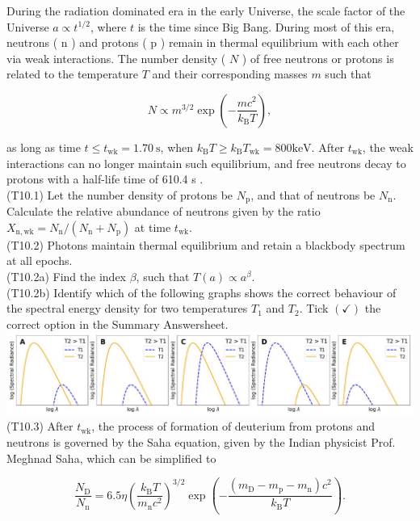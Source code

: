 \documentclass[10pt]{article}
\begin{document}
    During the radiation dominated era in the early Universe, the scale factor of the Universe $a \propto t^{1 / 2}$, where $t$ is the time since Big Bang. During most of this era, neutrons ( n ) and protons ( p ) remain in thermal equilibrium with each other via weak interactions. The number density ( $N$ ) of free neutrons or protons is related to the temperature $T$ and their corresponding masses $m$ such that

    $$
    N \propto m^{3 / 2} \exp \left(-\frac{m c^{2}}{k_{\mathrm{B}} T}\right),
    $$
    
    as long as time $t \leq t_{\mathrm{wk}}=1.70 \mathrm{~s}$, when $k_{\mathrm{B}} T \geq k_{\mathrm{B}} T_{\mathrm{wk}}=800 \mathrm{keV}$. After $t_{\mathrm{wk}}$, the weak interactions can no longer maintain such equilibrium, and free neutrons decay to protons with a half-life time of 610.4 s .\\
    (T10.1) Let the number density of protons be $N_{\mathrm{p}}$, and that of neutrons be $N_{\mathrm{n}}$. Calculate the relative abundance of neutrons given by the ratio $X_{\mathrm{n}, \mathrm{wk}}=N_{\mathrm{n}} /\left(N_{\mathrm{n}}+N_{\mathrm{p}}\right)$ at time $t_{\mathrm{wk}}$.\\
    (T10.2) Photons maintain thermal equilibrium and retain a blackbody spectrum at all epochs.\\
    (T10.2a) Find the index $\beta$, such that $T(a) \propto a^{\beta}$.\\
    (T10.2b) Identify which of the following graphs shows the correct behaviour of the spectral energy density for two temperatures $T_{1}$ and $T_{2}$. Tick $(\checkmark)$ the correct option in the Summary Answersheet.\\
    \includegraphics[max width=\textwidth, center]{2025_08_23_e94579452776a99c4850g-12}\\
    (T10.3) After $t_{\mathrm{wk}}$, the process of formation of deuterium from protons and neutrons is governed by the Saha equation, given by the Indian physicist Prof. Meghnad Saha, which can be simplified to
    
    $$
    \frac{N_{\mathrm{D}}}{N_{\mathrm{n}}}=6.5 \eta\left(\frac{k_{\mathrm{B}} T}{m_{\mathrm{n}} c^{2}}\right)^{3 / 2} \exp \left(-\frac{\left(m_{\mathrm{D}}-m_{\mathrm{p}}-m_{\mathrm{n}}\right) c^{2}}{k_{\mathrm{B}} T}\right) .
    $$
    
\end{document}
